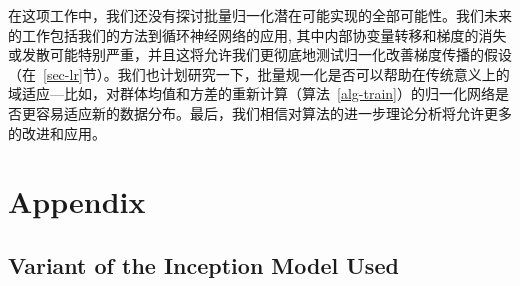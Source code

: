 \documentclass[twocolumn]{article}
\begin{document}
在这项工作中，我们还没有探讨批量归一化潜在可能实现的全部可能性。我们未来的工作包括我们的方法到循环神经网络的应用\cite{pascanu-rnn}, 其中内部协变量转移和梯度的消失或发散可能特别严重，并且这将允许我们更彻底地测试归一化改善梯度传播的假设（在~\ref{sec-lr}节）。我们也计划研究一下，批量规一化是否可以帮助在传统意义上的域适应—比如，对群体均值和方差的重新计算（算法~\ref{alg-train}）的归一化网络是否更容易适应新的数据分布。最后，我们相信对算法的进一步理论分析将允许更多的改进和应用。





\section*{Appendix}
\subsection*{Variant of the Inception Model Used}
\end{document}
